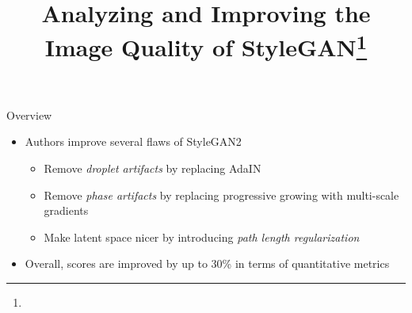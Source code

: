 \documentclass[handout, 10pt]{beamer}
\title{Analyzing and Improving the Image Quality of StyleGAN\footnote{\citepaper{StyleGAN2}}}
\begin{document}
\begin{frame}
    \titlepage
\end{frame}

\begin{frame}{Overview}
\begin{itemize}
    \item\pause Authors improve several flaws of StyleGAN2
    \begin{itemize}
        \item\pause Remove \textit{droplet artifacts} by replacing AdaIN
        \item\pause Remove \textit{phase artifacts} by replacing progressive growing with multi-scale gradients
        \item\pause Make latent space nicer by introducing \textit{path length regularization}
    \end{itemize}
    \item\pause Overall, scores are improved by up to 30\% in terms of quantitative metrics
\end{itemize}

\end{frame}
\end{document}
